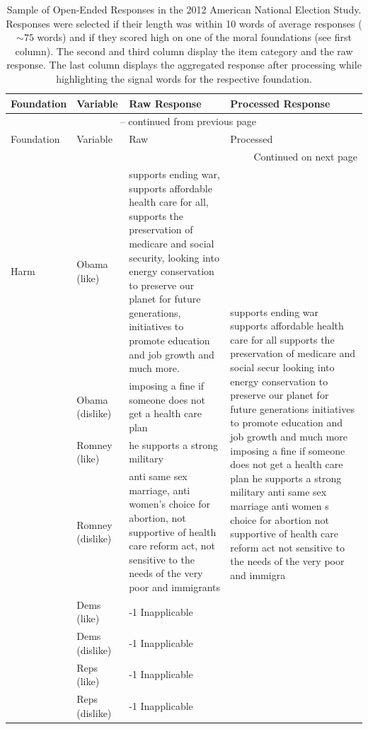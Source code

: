 \documentclass[12pt]{article}
\begin{document}
\clearpage

\begin{center}

\begin{longtable}{lp{1.5cm}p{5.5cm}p{5.5cm}}
\caption[Open-Ended Responses]{Sample of Open-Ended Responses in the 2012 American National Election Study. Responses were selected if their length was within 10 words of average responses ($\sim75$ words) and if they scored high on one of the moral foundations (see first column). The second and third column display the item category and the raw response. The last column displays the aggregated response after processing while highlighting the signal words for the respective foundation.} \label{app:sample} \\

\hline
	Foundation & Variable & Raw Response & Processed Response \\ \hline \endfirsthead
	
	\multicolumn{4}{c}{{\tablename\ \thetable{} -- continued from previous page}} \\
	\hline Foundation & Variable & Raw & Processed \\ \hline \endhead
	
	\hline \multicolumn{4}{r}{{Continued on next page}} \\	\endfoot
	
	\hline	\endlastfoot
	
	Harm & Obama (like) & supports ending war, supports affordable health care for all, supports the preservation of medicare and social security, looking into energy conservation to preserve our planet for future generations, initiatives to promote education and job growth and much more. & \multirow{8}{5.5cm}{supports ending war supports affordable health care for all supports the preservation of medicare and social secur looking into energy conservation to preserve our planet for future generations initiatives to promote education and job growth and much more imposing a fine if someone does not get a health care plan he supports a strong military anti same sex marriage anti women s choice for abortion not supportive of health care reform act not sensitive to the needs of the very poor and immigra} \\
		 & Obama (dislike) & imposing a fine if someone does not get a health care plan \\
		 & Romney (like) & he supports a strong military \\
		 & Romney (dislike) & anti same sex marriage, anti women's choice for abortion, not supportive of health care reform act, not sensitive to the needs of the very poor and immigrants \\
		 & Dems (like) & -1 Inapplicable \\
		 & Dems (dislike) & -1 Inapplicable \\
		 & Reps (like) & -1 Inapplicable \\
		 & Reps (dislike) & -1 Inapplicable \\ \hline
	

\end{longtable}
\end{center}
\end{document}
